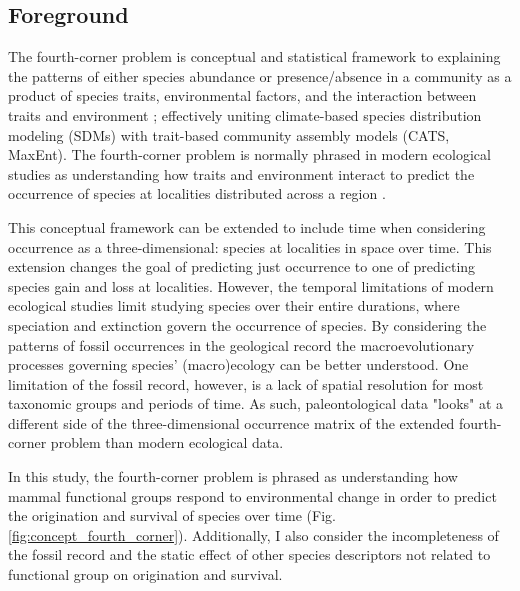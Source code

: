 \documentclass[12pt,letterpaper]{article}
\begin{document}
\subsection*{Foreground}

The fourth-corner problem is conceptual and statistical framework to explaining the patterns of either species abundance or presence/absence in a community as a product of species traits, environmental factors, and the interaction between traits and environment \citep{Brown2014c,Warton2015a,Pollock2012,Jamil2013}; effectively uniting climate-based species distribution modeling (SDMs) with trait-based community assembly models (CATS, MaxEnt). The fourth-corner problem is normally phrased in modern ecological studies as understanding how traits and environment interact to predict the occurrence of species at localities distributed across a region \citep{Pollock2012,Jamil2013}. 

This conceptual framework can be extended to include time when considering occurrence as a three-dimensional: species at localities in space over time. This extension changes the goal of predicting just occurrence to one of predicting species gain and loss at localities. However, the temporal limitations of modern ecological studies limit studying species over their entire durations, where speciation and extinction govern the occurrence of species. By considering the patterns of fossil occurrences in the geological record the macroevolutionary processes governing species' (macro)ecology can be better understood. One limitation of the fossil record, however, is a lack of spatial resolution for most taxonomic groups and periods of time. As such, paleontological data "looks" at a different side of the three-dimensional occurrence matrix of the extended fourth-corner problem than modern ecological data.

In this study, the fourth-corner problem is phrased as understanding how mammal functional groups respond to environmental change in order to predict the origination and survival of species over time (Fig. \ref{fig:concept_fourth_corner}). Additionally, I also consider the incompleteness of the fossil record and the static effect of other species descriptors not related to functional group on origination and survival.
\end{document}
